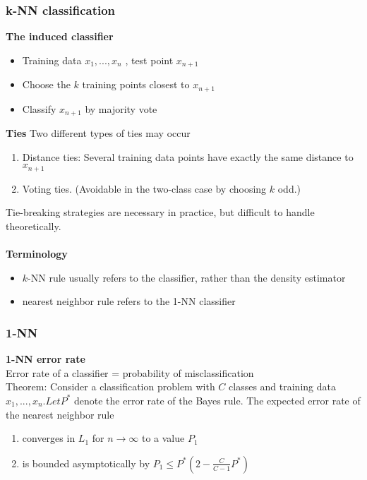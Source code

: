 \documentclass[main]{subfiles}
\begin{document}
\subsubsection{k-NN classification}
\textbf{The induced classifier}
\begin{itemize}
\item Training data $x_1, . . . , x_n$ , test point $x_{n+1}$
\item Choose the $k$ training points closest to $x_{n+1}$
\item Classify $x_{n+1}$ by majority vote

\end{itemize}
\textbf{Ties}
Two different types of ties may occur
\begin{enumerate}
\item Distance ties: Several training data points
have exactly the same distance to $x_{n+1}$
\item Voting ties. (Avoidable in the two-class case
by choosing $k$ odd.)

\end{enumerate}
Tie-breaking strategies are necessary in practice,
but difficult to handle theoretically.\\\\
\textbf{Terminology}
\begin{itemize}
\item $k$-NN rule usually refers to the classifier,
rather than the density estimator
\item nearest neighbor rule refers to the 1-NN
classifier

\end{itemize}

\subsubsection{1-NN}
\textbf{1-NN error rate}\\
 Error rate of a classifier = probability of
misclassification\\
Theorem: Consider a classification problem with $C$ classes
and training data $x_1, . . . , x_n . Let P^*$
denote the error
rate of the Bayes rule. The expected error rate of
the nearest neighbor rule
\begin{enumerate}
\item converges in $L_1$ for $n \to \infty$ to a value $P_1$
\item is bounded asymptotically by $P_1 \le P^* \left ( 2- \frac{C}{C-1} P^* \right)$


\end{enumerate}
\end{document}
